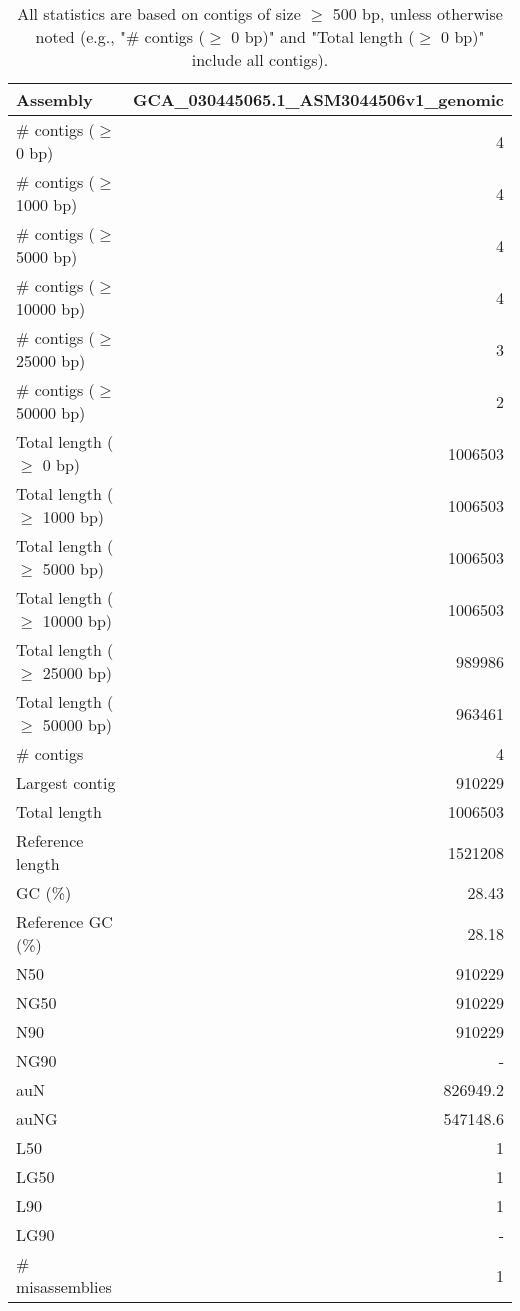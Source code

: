 \documentclass[12pt,a4paper]{article}
\begin{document}
\begin{table}[ht]
\begin{center}
\caption{All statistics are based on contigs of size $\geq$ 500 bp, unless otherwise noted (e.g., "\# contigs ($\geq$ 0 bp)" and "Total length ($\geq$ 0 bp)" include all contigs).}
\begin{tabular}{|l*{1}{|r}|}
\hline
Assembly & GCA\_030445065.1\_ASM3044506v1\_genomic \\ \hline
\# contigs ($\geq$ 0 bp) & 4 \\ \hline
\# contigs ($\geq$ 1000 bp) & 4 \\ \hline
\# contigs ($\geq$ 5000 bp) & 4 \\ \hline
\# contigs ($\geq$ 10000 bp) & 4 \\ \hline
\# contigs ($\geq$ 25000 bp) & 3 \\ \hline
\# contigs ($\geq$ 50000 bp) & 2 \\ \hline
Total length ($\geq$ 0 bp) & 1006503 \\ \hline
Total length ($\geq$ 1000 bp) & 1006503 \\ \hline
Total length ($\geq$ 5000 bp) & 1006503 \\ \hline
Total length ($\geq$ 10000 bp) & 1006503 \\ \hline
Total length ($\geq$ 25000 bp) & 989986 \\ \hline
Total length ($\geq$ 50000 bp) & 963461 \\ \hline
\# contigs & 4 \\ \hline
Largest contig & 910229 \\ \hline
Total length & 1006503 \\ \hline
Reference length & 1521208 \\ \hline
GC (\%) & 28.43 \\ \hline
Reference GC (\%) & 28.18 \\ \hline
N50 & 910229 \\ \hline
NG50 & 910229 \\ \hline
N90 & 910229 \\ \hline
NG90 & - \\ \hline
auN & 826949.2 \\ \hline
auNG & 547148.6 \\ \hline
L50 & 1 \\ \hline
LG50 & 1 \\ \hline
L90 & 1 \\ \hline
LG90 & - \\ \hline
\# misassemblies & 1 \\ \hline

\end{tabular}
\end{center}
\end{table}
\end{document}
